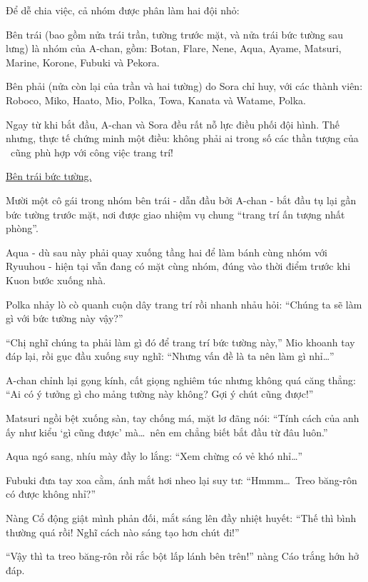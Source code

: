 \documentclass[../main.tex]{subfiles}
\begin{document}
Để dễ chia việc, cả nhóm được phân làm hai đội nhỏ:

Bên trái (bao gồm nửa trái trần, tường trước mặt, và nửa trái bức tường sau lưng) là nhóm của A-chan, gồm: Botan, Flare, Nene, Aqua, Ayame, Matsuri, Marine, Korone, Fubuki và Pekora.

Bên phải (nửa còn lại của trần và hai tường) do Sora chỉ huy, với các thành viên: Roboco, Miko, Haato, Mio, Polka, Towa, Kanata và Watame, Polka.

Ngay từ khi bắt đầu, A-chan và Sora đều rất nỗ lực điều phối đội hình. Thế nhưng, thực tế chứng minh một điều: không phải ai trong số các thần tượng của \hll\ cũng phù hợp với công việc trang trí!

\begin{center}
    \uline{Bên trái bức tường.}
\end{center}

Mười một cô gái trong nhóm bên trái - dẫn đầu bởi A-chan - bắt đầu tụ lại gần bức tường trước mặt, nơi được giao nhiệm vụ chung ``trang trí ấn tượng nhất phòng''.

Aqua - dù sau này phải quay xuống tầng hai để làm bánh cùng nhóm với Ryuuhou - hiện tại vẫn đang có mặt cùng nhóm, đúng vào thời điểm trước khi Kuon bước xuống nhà.

Polka nhảy lò cò quanh cuộn dây trang trí rồi nhanh nhảu hỏi: ``Chúng ta sẽ làm gì với bức tường này vậy?''

``Chị nghĩ chúng ta phải làm gì đó để trang trí bức tường này,'' Mio khoanh tay đáp lại, rồi gục đầu xuống suy nghĩ: ``Nhưng vấn đề là ta nên làm gì nhỉ\dots''

A-chan chỉnh lại gọng kính, cất giọng nghiêm túc nhưng không quá căng thẳng: ``Ai có ý tưởng gì cho mảng tường này không? Gợi ý chút cũng được!''

Matsuri ngồi bệt xuống sàn, tay chống má, mặt lơ đãng nói: ``Tính cách của anh ấy như kiểu `gì cũng được' mà\dots\ nên em chẳng biết bắt đầu từ đâu luôn.''

Aqua ngó sang, nhíu mày đầy lo lắng: ``Xem chừng có vẻ khó nhỉ\dots''

Fubuki đưa tay xoa cằm, ánh mắt hơi nheo lại suy tư: ``Hmmm\dots\ Treo băng-rôn có được không nhỉ?''

Nàng Cổ động giật mình phản đối, mắt sáng lên đầy nhiệt huyết: ``Thế thì bình thường quá rồi! Nghĩ cách nào sáng tạo hơn chút đi!''

``Vậy thì ta treo băng-rôn rồi rắc bột lấp lánh bên trên!'' nàng Cáo trắng hớn hở đáp.
\end{document}
